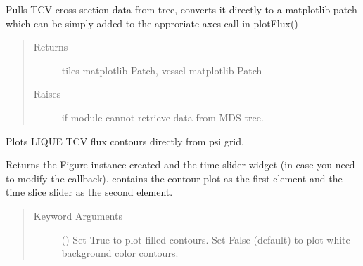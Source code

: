 \documentclass[letterpaper,10pt,english]{sphinxmanual}
\begin{document}
\begin{fulllineitems}
\begin{fulllineitems}
\label{\detokenize{eqtools:eqtools.TCVLIUQE.TCVLIUQETree.getMachineCrossSectionPatch}}
Pulls TCV cross-section data from tree, converts it directly to
a matplotlib patch which can be simply added to the approriate axes
call in plotFlux()
\begin{quote}\begin{description}
\item[{Returns}] \leavevmode
tiles matplotlib Patch, vessel matplotlib Patch

\item[{Raises}] \leavevmode
{} \textendash{} if module cannot retrieve data from MDS tree.

\end{description}\end{quote}

\end{fulllineitems}


\begin{fulllineitems}
\label{\detokenize{eqtools:eqtools.TCVLIUQE.TCVLIUQETree.plotFlux}}
Plots LIQUE TCV flux contours directly from psi grid.

Returns the Figure instance created and the time slider widget (in case
you need to modify the callback).  contains the contour plot as
the first element and the time slice slider as the second element.
\begin{quote}\begin{description}
\item[{Keyword Arguments}] \leavevmode
{} () \textendash{} Set True to plot filled contours.  Set False (default) to plot white-background
color contours.

\end{description}\end{quote}

\end{fulllineitems}


\end{fulllineitems}
\end{document}
